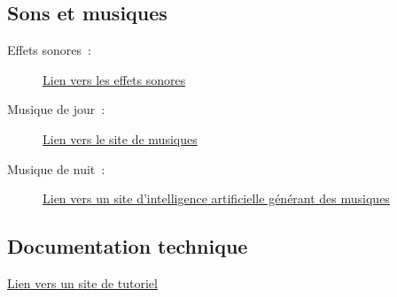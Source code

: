 \documentclass[a4paper,12pt]{article}
\begin{document}
\begin{appendices}
\subsection{Sons et musiques}
\begin{description}
	\item[Effets sonores :] \href{https://pixabay.com/fr/sound-effects/}{Lien vers les effets sonores}
	\item[Musique de jour :] \href{https://www.jamendo.com/?language=fr}{Lien vers le site de musiques}
	\item[Musique de nuit :] \href{https://www.udio.com/}{Lien vers un site d'intelligence artificielle générant des musiques}
\end{description}

\subsection{Documentation technique}
\href{https://openclassrooms.com/forum/sujet/projet-termine-jeu-de-plateforme-cree-en-sdl-2}{Lien vers un site de tutoriel}

\newpage

\end{appendices}
\end{document}
